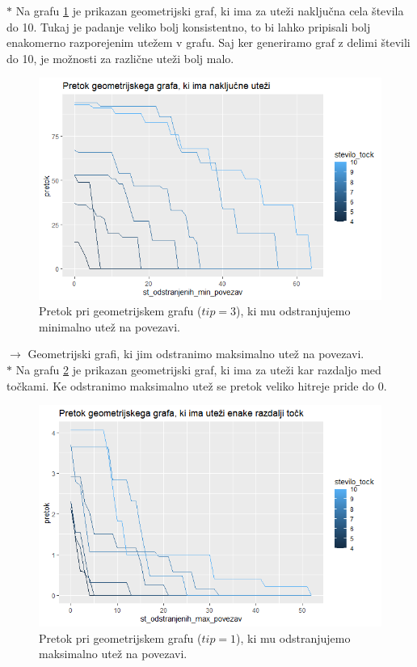 \documentclass[a4paper]{article}
\begin{document}
$\ast$ Na grafu \ref{fig11} je prikazan geometrijski graf, ki ima za uteži naključna cela števila do 10. Tukaj je padanje veliko bolj konsistentno, to bi lahko pripisali bolj enakomerno razporejenim utežem v grafu. Saj ker generiramo graf z delimi števili do 10, je možnosti za različne uteži bolj malo. 
\begin{figure}[H]
\centerline{\includegraphics[scale=.5]{p9.PNG}}
\caption{Pretok pri geometrijskem grafu ($tip = 3$), ki mu odstranjujemo minimalno utež na povezavi.}
\label{fig11}
\end{figure} 

$\rightarrow $ Geometrijski grafi, ki jim odstranimo maksimalno utež na povezavi. \\

$\ast$ Na grafu \ref{fig12} je prikazan geometrijski graf, ki ima za uteži kar razdaljo med točkami. Ke odstranimo maksimalno utež se pretok veliko hitreje pride do 0. 
\begin{figure}[H]
\centerline{\includegraphics[scale=.5]{p8_1.PNG}}
\caption{Pretok pri geometrijskem grafu ($tip = 1$), ki mu odstranjujemo maksimalno utež na povezavi.}
\label{fig12}
\end{figure}
\end{document}
